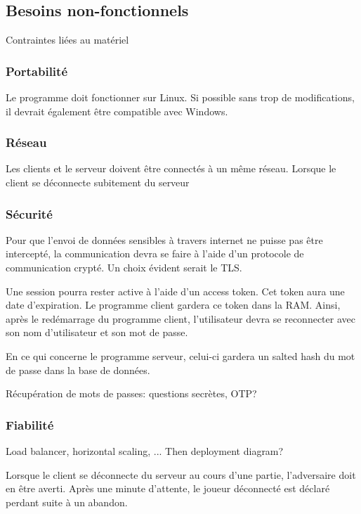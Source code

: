 \documentclass[french, utf8]{article}
\begin{document}
\subsection{Besoins non-fonctionnels}
Contraintes liées au matériel

\subsubsection{Portabilité}

Le programme doit fonctionner sur Linux. Si possible sans trop de modifications, il devrait également être compatible avec Windows.

\subsubsection{Réseau}

Les clients et le serveur doivent être connectés à un même réseau. Lorsque le client se déconnecte subitement du serveur

\subsubsection{Sécurité}

Pour que l'envoi de données sensibles à travers internet ne puisse pas être intercepté, la communication devra se faire à l'aide d'un protocole de communication crypté. Un choix évident serait le TLS.

Une session pourra rester active à l'aide d'un access token.
Cet token aura une date d'expiration. Le programme client gardera ce token dans la RAM.
Ainsi, après le redémarrage du programme client, l'utilisateur devra se reconnecter avec son nom d'utilisateur et son mot de passe.


En ce qui concerne le programme serveur, celui-ci gardera un salted hash du mot de passe dans la base de données.

Récupération de mots de passes: questions secrètes, OTP?

\subsubsection{Fiabilité}

Load balancer, horizontal scaling, ... Then deployment diagram?

Lorsque le client se déconnecte du serveur au cours d'une partie, l'adversaire doit en être averti.
Après une minute d'attente, le joueur déconnecté est déclaré perdant suite à un abandon.
\end{document}
